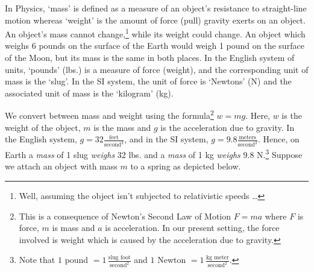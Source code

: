\documentclass{ximera}
\begin{document}
\smallskip

In Physics, `mass' is defined as a measure of an object's resistance to straight-line motion whereas `weight' is the amount of force (pull) gravity exerts on an object.  An object's mass cannot change,\footnote{Well, assuming the object isn't subjected to relativistic speeds \dots} while its weight could change.  An object which weighs 6 pounds on the surface of the Earth would weigh 1 pound on the surface of the Moon, but its mass is the same in both places. In the English system of units, `pounds' (lbs.) is a measure of force (weight), and the corresponding unit of mass is the `slug'. In the SI system, the unit of force is `Newtons' (N) and the associated unit of mass is the `kilogram' (kg). 

\smallskip

We convert between mass and weight using the formula\footnote{This is a consequence of Newton's Second Law of Motion $F = ma$ where $F$ is force, $m$ is mass and $a$ is acceleration.  In our present setting, the force involved is weight which is caused by the acceleration due to gravity.} $w = mg$.   Here, $w$ is the weight of the object, $m$ is the mass and $g$ is the acceleration due to gravity.  In the English system, $g = 32 \frac{\text{feet}}{\text{second}^2}$, and in the SI system, $g = 9.8\frac{\text{meters}}{\text{second}^2}$. Hence, on Earth a \textit{mass} of 1 slug \textit{weighs} 32 lbs. and a \textit{mass} of 1 kg \textit{weighs} 9.8 N.\footnote{Note that $1$ pound $ = 1 \, \frac{\text{slug foot}}{\text{second}^2}$ and $1$ Newton $ = 1 \, \frac{\text{kg meter}}{\text{second}^2}$.}    Suppose we attach an object with mass $m$ to a spring as depicted below. 
\end{document}
